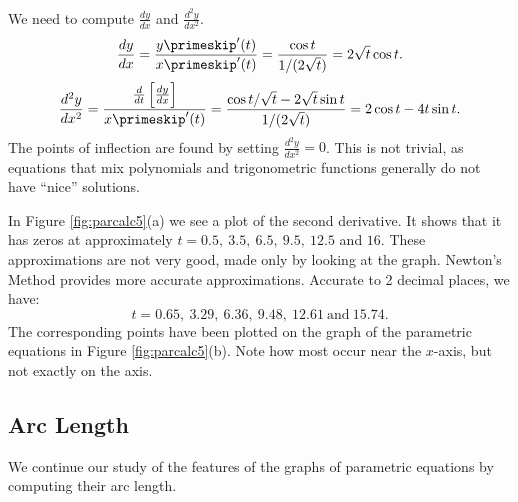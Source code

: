 {We need to compute $\frac{dy}{dx}$ and $\frac{d^2y}{dx^2}$. 
$$\frac{dy}{dx} = \frac{y\primeskip'(t)}{x\primeskip'(t)} = \frac{\cos t}{1/(2\sqrt{t})} = 2\sqrt{t}\cos t.$$
$$\frac{d^2y}{dx^2} = \frac{\frac{d}{dt}\left[\frac{dy}{dx}\right]}{x\primeskip'(t)} = \frac{\cos t/\sqrt{t}-2\sqrt{t}\sin t}{1/(2\sqrt{t})}=2\cos t-4t\sin t.$$
The points of inflection are found by setting $\frac{d^2y}{dx^2}=0$. This is not trivial, as equations that mix polynomials and trigonometric functions generally do not have ``nice'' solutions. 

In Figure \ref{fig:parcalc5}(a) we see a plot of the second derivative. It shows that it has zeros at approximately $t=0.5,\ 3.5,\ 6.5,\ 9.5,\ 12.5$ and $16$. These approximations are not very good, made only by looking at the graph. Newton's Method provides more accurate approximations. Accurate to 2 decimal places, we have:
$$t=0.65,\ 3.29,\ 6.36,\ 9.48,\ 12.61\ \text{and}\ 15.74.$$
The corresponding points have been plotted on the graph of the parametric equations in Figure \ref{fig:parcalc5}(b). Note how most occur near the $x$-axis, but not exactly on the axis. 
}

\subsection*{Arc Length}

We continue our study of the features of the graphs of parametric equations by computing their arc length.


